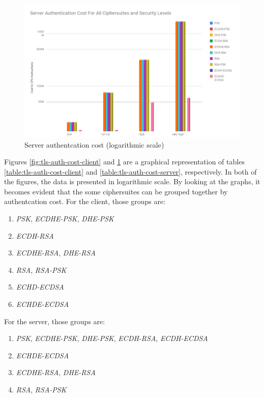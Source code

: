 \documentclass{llncs}
\begin{document}
\begin{figure}
  \centering
  \includegraphics[width=1.0\textwidth]{img/tls-server-auth-cost.png}
  \caption{\label{fig:tls-auth-cost-server} Server authentcation cost (logarithmic scale)}
\end{figure}


Figures \ref{fig:tls-auth-cost-client} and \ref{fig:tls-auth-cost-server} are a graphical representation of tables \ref{table:tls-auth-cost-client} and \ref{table:tls-auth-cost-server},
respectively. In both of the figures, the data is presented in logarithmic scale. By looking at the graphs, it becomes evident that the some ciphersuites can be grouped together by authentcation cost.
For the client, those groups are:

\begin{enumerate}
  \item \textit{PSK}, \textit{ECDHE-PSK}, \textit{DHE-PSK}
  \item \textit{ECDH-RSA}
  \item \textit{ECDHE-RSA}, \textit{DHE-RSA}
  \item \textit{RSA}, \textit{RSA-PSK}
  \item \textit{ECHD-ECDSA}
  \item \textit{ECHDE-ECDSA}
\end{enumerate}

For the server, those groups are:

\begin{enumerate}
  \item \textit{PSK}, \textit{ECDHE-PSK}, \textit{DHE-PSK}, \textit{ECDH-RSA}, \textit{ECDH-ECDSA}
  \item \textit{ECHDE-ECDSA}
  \item \textit{ECDHE-RSA}, \textit{DHE-RSA}
  \item \textit{RSA}, \textit{RSA-PSK}
\end{enumerate}
\end{document}
